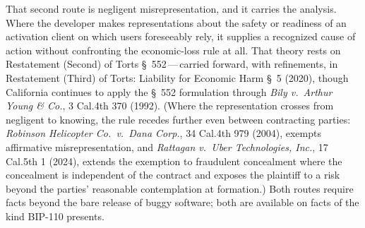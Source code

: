 \documentclass[11pt, twoside, openright]{book}
\begin{document}
That second route is negligent misrepresentation, and it carries the analysis. Where the developer makes representations about the safety or readiness of an activation client on which users foreseeably rely, it supplies a recognized cause of action without confronting the economic-loss rule at all. That theory rests on Restatement (Second) of Torts \S~552\,---\,carried forward, with refinements, in Restatement (Third) of Torts: Liability for Economic Harm \S~5 (2020), though California continues to apply the \S~552 formulation through \textit{Bily v.~Arthur Young \& Co.}, 3 Cal.4th 370 (1992). (Where the representation crosses from negligent to knowing, the rule recedes further even between contracting parties: \textit{Robinson Helicopter Co.~v.~Dana Corp.}, 34 Cal.4th 979 (2004), exempts affirmative misrepresentation, and \textit{Rattagan v.~Uber Technologies, Inc.}, 17 Cal.5th 1 (2024), extends the exemption to fraudulent concealment where the concealment is independent of the contract and exposes the plaintiff to a risk beyond the parties' reasonable contemplation at formation.) Both routes require facts beyond the bare release of buggy software; both are available on facts of the kind BIP-110 presents.
\end{document}
